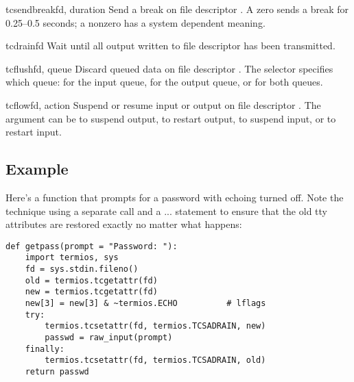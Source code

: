 \begin{funcdesc}{tcsendbreak}{fd, duration}
Send a break on file descriptor .  A zero  sends
a break for 0.25--0.5 seconds; a nonzero  has a system
dependent meaning.
\end{funcdesc}

\begin{funcdesc}{tcdrain}{fd}
Wait until all output written to file descriptor  has been
transmitted.
\end{funcdesc}

\begin{funcdesc}{tcflush}{fd, queue}
Discard queued data on file descriptor .  The 
selector specifies which queue:  for the input
queue,  for the output queue, or
 for both queues.
\end{funcdesc}

\begin{funcdesc}{tcflow}{fd, action}
Suspend or resume input or output on file descriptor .  The
 argument can be  to suspend output,
 to restart output,  to suspend
input, or  to restart input.
\end{funcdesc}


\begin{seealso}
\end{seealso}


\subsection{Example}

Here's a function that prompts for a password with echoing turned
off.  Note the technique using a separate  call
and a  ...  statement to ensure that the
old tty attributes are restored exactly no matter what happens:

\begin{verbatim}
def getpass(prompt = "Password: "):
    import termios, sys
    fd = sys.stdin.fileno()
    old = termios.tcgetattr(fd)
    new = termios.tcgetattr(fd)
    new[3] = new[3] & ~termios.ECHO          # lflags
    try:
        termios.tcsetattr(fd, termios.TCSADRAIN, new)
        passwd = raw_input(prompt)
    finally:
        termios.tcsetattr(fd, termios.TCSADRAIN, old)
    return passwd
\end{verbatim}


